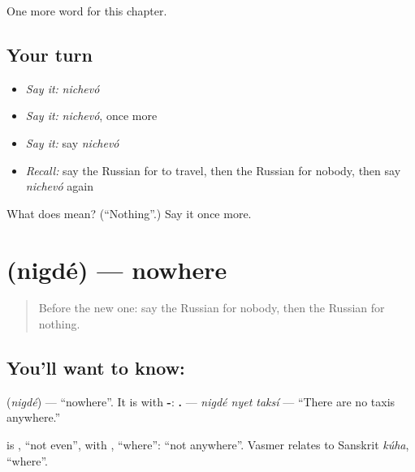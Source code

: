 \begin{grammarlens}[title={What you've built}]
One more word for this chapter.
\end{grammarlens}

\subsection*{Your turn}
\begin{itemize}
\raggedright
  \item \emph{Say it:} \emph{nichevó}
  \item \emph{Say it:} \emph{nichevó}, once more
  \item \emph{Say it:} say \emph{nichevó}
  \item \emph{Recall:} say the Russian for to travel, then the Russian for nobody, then say \emph{nichevó} again
\end{itemize}

\begin{tcolorbox}[breakable,colback=teal!4,colframe=teal!35!black,title={Before you move on}]
What does  mean? (\textquotedblleft{}Nothing\textquotedblright{}.) Say it once more.
\end{tcolorbox}
\section[\texorpdfstring{\ru{нигде} (nigdé)}{нигде (nigdé)}]{ (nigdé) — nowhere}

\label{lesson:RU-C136-nigde}



\begin{quote}
Before the new one: say the Russian for nobody, then the Russian for nothing.
\end{quote}

\subsection*{You'll want to know: }
\textbf{} (\emph{nigdé}) — \textquotedblleft{}nowhere\textquotedblright{}. It is \textbf{} with \textbf{-}: \textbf{  .} — \emph{nigdé nyet taksí} — \textquotedblleft{}There are no taxis anywhere.\textquotedblright{}

\begin{cousinweb}
\textbf{} is \emph{}, \textquotedblleft{}not even\textquotedblright{}, with \emph{}, \textquotedblleft{}where\textquotedblright{}: \textquotedblleft{}not anywhere\textquotedblright{}. Vasmer relates \emph{} to Sanskrit \emph{kúha}, \textquotedblleft{}where\textquotedblright{}.
\end{cousinweb}

